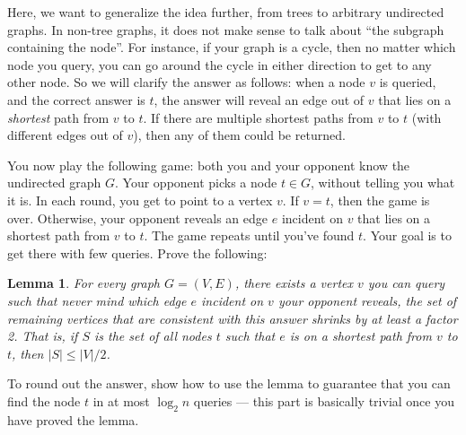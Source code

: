 \documentclass[10pt]{article}
\newtheorem{lemma}{Lemma}
\begin{document}
Here, we want to generalize the idea further, from trees to arbitrary undirected graphs. In non-tree graphs, it does not make sense to talk about ``the subgraph containing the node''. For instance, if your graph is a cycle, then no matter which node you query, you can go around the cycle in either direction to get to any other node. So we will clarify the answer as follows: when a node $v$ is queried, and the correct answer is $t$, the answer will reveal an edge out of $v$ that lies on a \emph{shortest} path from $v$ to $t$. If there are multiple shortest paths from $v$ to $t$ (with different edges out of $v$), then any of them could be returned.

You now play the following game: both you and your opponent know the undirected graph $G$. Your opponent picks a node $t \in G$, without telling you what it is. In each round, you get to point to a vertex $v$. If $v=t$, then the game is over. Otherwise, your opponent reveals an edge $e$ incident on $v$ that lies on a shortest path from $v$ to $t$. The game repeats until you've found $t$. Your goal is to get there with few queries.
Prove the following:

\begin{lemma} \label{lem:median}
  For every graph $G=(V,E)$, there exists a vertex $v$ you can query such that never mind which edge $e$ incident on $v$ your opponent reveals, the set of remaining vertices that are consistent with this answer shrinks by at least a factor 2. That is, if $S$ is the set of all nodes $t$ such that $e$ is on a shortest path from $v$ to $t$, then $|S| \leq |V|/2$.
\end{lemma}

To round out the answer, show how to use the lemma to guarantee that you can find the node $t$ in at most $\log_2 n$ queries --- this part is basically trivial once you have proved the lemma.
\end{document}
